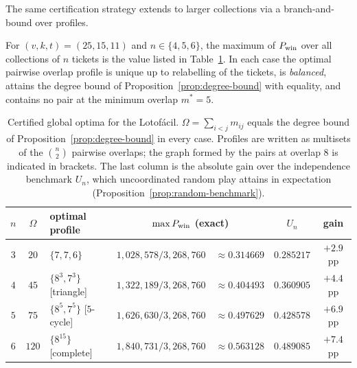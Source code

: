 The same certification strategy extends to larger collections via a
branch-and-bound over profiles.

\begin{theorem}
  \label{thm:certified-optima}
  For $(v,k,t) = (25,15,11)$ and $n \in \{4,5,6\}$, the maximum of
  $P_{\mathrm{win}}$ over all collections of $n$ tickets is the value listed in
  Table~\ref{tab:certified-optima}.  In each case the optimal pairwise
  overlap profile is unique up to relabelling of the tickets, is
  \emph{balanced}, attains the degree bound of
  Proposition~\ref{prop:degree-bound} with equality, and contains no pair
  at the minimum overlap $m^* = 5$.
\end{theorem}

\begin{table}[ht]
  \centering
  \caption{Certified global optima for the Lotof\'{a}cil.  $\Omega =
    \sum_{i<j} m_{ij}$ equals the degree bound of
    Proposition~\ref{prop:degree-bound} in every case.  Profiles are
    written as multisets of the $\binom{n}{2}$ pairwise overlaps; the
    graph formed by the pairs at overlap $8$ is indicated in brackets.
    The last column is the absolute gain over the independence benchmark
    $U_n$, which uncoordinated random play attains in expectation
    (Proposition~\ref{prop:random-benchmark}).}
  \label{tab:certified-optima}
  \smallskip
  \begin{tabular}{@{}c c l r@{\,}l c c@{}}
    \toprule
    $n$ & $\Omega$ & optimal profile
        & \multicolumn{2}{c}{$\max P_{\mathrm{win}}$ (exact)} & $U_n$ & gain \\
    \midrule
    $3$ & $20$  & $\{7,7,6\}$
        & $1{,}028{,}578/3{,}268{,}760$ & $\approx 0.314669$
        & $0.285217$ & $+2.9$ pp \\
    $4$ & $45$  & $\{8^3, 7^3\}$ [triangle]
        & $1{,}322{,}189/3{,}268{,}760$ & $\approx 0.404493$
        & $0.360905$ & $+4.4$ pp \\
    $5$ & $75$  & $\{8^5, 7^5\}$ [$5$-cycle]
        & $1{,}626{,}630/3{,}268{,}760$ & $\approx 0.497629$
        & $0.428578$ & $+6.9$ pp \\
    $6$ & $120$ & $\{8^{15}\}$ [complete]
        & $1{,}840{,}731/3{,}268{,}760$ & $\approx 0.563128$
        & $0.489085$ & $+7.4$ pp \\
    \bottomrule
  \end{tabular}
\end{table}

